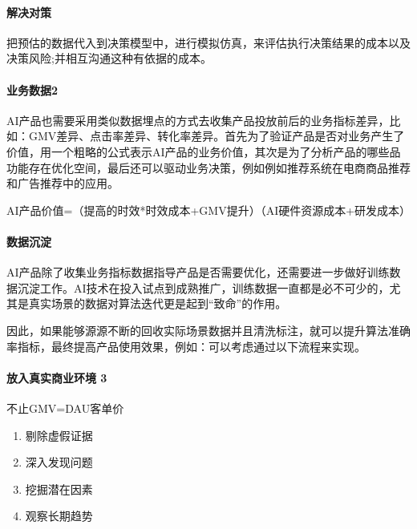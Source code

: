 \documentclass[letterpaper,11pt,english]{sphinxmanual}
\begin{document}
\paragraph{解决对策}
\label{\detokenize{chapter_idea/data:id5}}
把预估的数据代入到决策模型中，进行模拟仿真，来评估执行决策结果的成本以及决策风险;并相互沟通这种有依据的成本。


\paragraph{业务数据2\sphinxfootnotemark[112]}
\label{\detokenize{chapter_idea/data:id6}}%
\begin{footnotetext}[112]\sphinxAtStartFootnote
{}
%
\end{footnotetext}\ignorespaces 
AI产品也需要采用类似数据埋点的方式去收集产品投放前后的业务指标差异，比如：GMV差异、点击率差异、转化率差异。首先为了验证产品是否对业务产生了价值，用一个粗略的公式表示AI产品的业务价值，其次是为了分析产品的哪些品功能存在优化空间，最后还可以驱动业务决策，例如例如推荐系统在电商商品推荐和广告推荐中的应用。

AI产品价值=（提高的时效*时效成本+GMV提升）\sphinxhyphen{}（AI硬件资源成本+研发成本）


\paragraph{数据沉淀}
\label{\detokenize{chapter_idea/data:id7}}
AI产品除了收集业务指标数据指导产品是否需要优化，还需要进一步做好训练数据沉淀工作。AI技术在投入试点到成熟推广，训练数据一直都是必不可少的，尤其是真实场景的数据对算法迭代更是起到“致命”的作用。

因此，如果能够源源不断的回收实际场景数据并且清洗标注，就可以提升算法准确率指标，最终提高产品使用效果，例如：可以考虑通过以下流程来实现。


\paragraph{放入真实商业环境 3\sphinxfootnotemark[113]}
\label{\detokenize{chapter_idea/data:id8}}%
\begin{footnotetext}[113]\sphinxAtStartFootnote
{}
%
\end{footnotetext}\ignorespaces 
不止GMV=DAU客单价
\begin{enumerate}
%
\item {} 
剔除虚假证据

\item {} 
深入发现问题

\item {} 
挖掘潜在因素

\item {} 
观察长期趋势

\end{enumerate}
\end{document}
